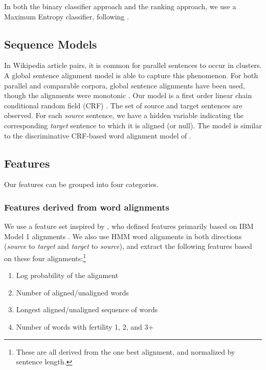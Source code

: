 In both the binary classifier approach and the ranking approach, we use a Maximum Entropy
classifier, following \citet{Munteanu05}.

\subsection{Sequence Models}
In Wikipedia article pairs, it is common for parallel sentences to
occur in clusters.  A global sentence alignment model is
able to capture this phenomenon. For both parallel and comparable
corpora, global sentence alignments have been used, though the
alignments were monotonic
\citep{Gale93,Moore02,Zhao02}.
Our model is a first order linear chain conditional random field
(CRF) \citep{Lafferty01}. The set of source and
target sentences are observed. For each {\em source} sentence, we
have a hidden variable indicating the corresponding {\em target}
sentence to which it is aligned (or null). The model is similar to the
discriminative CRF-based word alignment model of
\citep{Blunsom06}.

\subsection{Features}
\label{sec:features}
Our features can be grouped into four categories.

\subsubsection{Features derived from word alignments}

We use a feature set inspired by \citep{Munteanu05}, who defined
features primarily based on IBM Model 1 alignments
\citep{Brown93}.  We also use HMM word alignments
\citep{Vogel96} in both directions ({\em source} to {\em target} and
{\em target} to {\em source}), and extract the following features based on these
four alignments:\footnote{These are all derived from the one best alignment, and
normalized by sentence length.}

\begin{enumerate}
\item Log probability of the alignment
\item Number of aligned/unaligned words
\item Longest aligned/unaligned sequence of words
\item Number of words with fertility 1, 2, and 3+
\end{enumerate}

